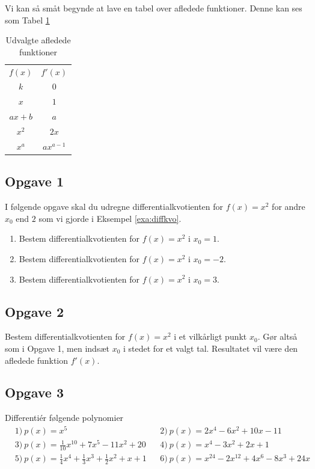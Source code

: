 Vi kan så småt begynde at lave en tabel over afledede funktioner. Denne kan ses som Tabel \ref{tab:afledt}
\begin{table}[H]
	\centering
	\begin{tabular}{cc}
		$f(x)$ & $f'(x)$ \\
		$k$ & $0$ \\
		$x$ & $1$ \\
		$ax + b$  & $a$ \\
		$x^2$ & $2x$ \\
		$x^a$ & $ax^{a-1} $
	\end{tabular}
	\caption{Udvalgte afledede funktioner}
	\label{tab:afledt}
\end{table}

\subsection*{Opgave 1}
I følgende opgave skal du udregne differentialkvotienten for $f(x) = x^2$ for andre $x_0$ end $2$ som vi gjorde i Eksempel \ref{exa:diffkvo}.
\begin{enumerate}[label=\roman*)]
	\item Bestem differentialkvotienten for $f(x) = x^2$ i $x_0 = 1$.
	\item Bestem differentialkvotienten for $f(x) = x^2$ i $x_0 = -2$.
	\item Bestem differentialkvotienten for $f(x) = x^2$ i $x_0 = 3$.
\end{enumerate}

\subsection*{Opgave 2}
Bestem differentialkvotienten for $f(x) = x^2$ i et vilkårligt punkt $x_0$. Gør altså som i Opgave 1, men indsæt $x_0$ i stedet for et valgt tal. Resultatet vil være den afledede funktion $f'(x)$.

\subsection*{Opgave 3}
Differentiér følgende polynomier
\begin{align*}
	&1) \ p(x) = x^5   &&2) \ p(x) = 2x^4-6x^2+10x-11     \\
	&3) \ p(x) = \frac{1}{10}x^{10}+7x^5-11x^2+20  &&4) \ p(x) = x^4-3x^2+2x+1     \\ 
	&5) \ p(x) = \frac{1}{4}x^4 + \frac{1}{3}x^3+\frac{1}{2}x^2+x + 1
	  &&6) \  p(x) = x^{24}-2x^{12}+4x^{6}-8x^{3}+24x   \\ 
\end{align*}

